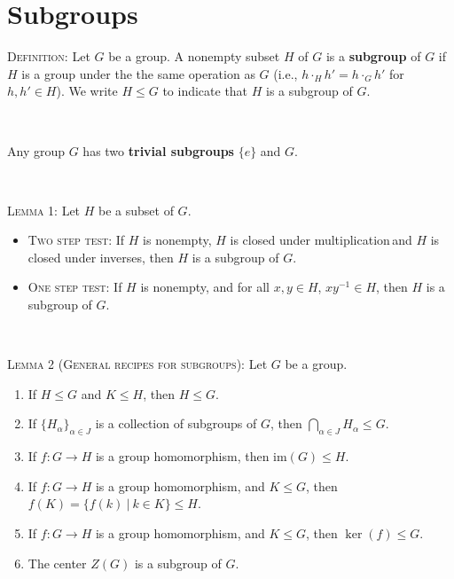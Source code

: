 \documentclass[12pt]{amsart}
\newcommand{\showsol}[1]{\def\displaysol{#1}}
\begin{document}
\showsol{0}
	
	\thispagestyle{empty}
	
	\section*{Subgroups}
	
	

\begin{framed}

\textsc{Definition:} Let $G$ be a group. A nonempty subset $H$ of $G$ is a \textbf{subgroup} of $G$ if $H$ is a group under the the same operation as $G$  (i.e., $h \cdot_H h' = h \cdot_G h'$ for $h,h'\in H$). We write $H\leq G$ to indicate that $H$ is a subgroup of $G$.

\

Any group $G$ has two \textbf{trivial subgroups} $\{e\}$ and $G$.

\

\textsc{Lemma 1:} Let $H$ be a subset of $G$.
\begin{itemize}
\item \textsc{Two step test:} If $H$ is nonempty, $H$ is closed under multiplication\footnotemark\,and $H$ is closed under inverses\footnotemark[1], then $H$ is a subgroup of $G$.
\item \textsc{One step test:} If $H$ is nonempty, and for all $x,y\in H$, $xy^{-1}\in H$, then $H$ is a subgroup of $G$.
\end{itemize}

\

\textsc{Lemma 2 (General recipes for subgroups):} Let $G$ be a group.
\begin{enumerate}
\item If $H\leq  G$ and $K\leq H$, then $H\leq G$.
\item If $\{ H_{\alpha} \}_{\alpha\in J}$ is a collection of subgroups of $G$, then $\bigcap_{\alpha\in J} H_\alpha \leq G$.
\item If $f:G\to H$ is a group homomorphism, then $\mathrm{im}(G) \leq H$.
\item If $f:G\to H$ is a group homomorphism, and $K\leq G$, then $f(K) = \{ f(k) \ | \ k\in K\} \leq H$.
\item If $f:G\to H$ is a group homomorphism, and $K\leq G$, then $\ker(f) \leq G$.
\item The center $Z(G)$ is a subgroup of $G$.
\end{enumerate}


\end{framed}
\end{document}

